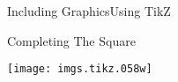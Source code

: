 \documentclass[\string~/GitHub/sthlmNordBeamerTheme/sthlmNordLightDemo.tex]{subfiles}
\begin{document}
\begin{frame}[c]{Including Graphics}{Using TikZ}
	\begin{block}{Completing The Square}
		\begin{center}
			\texttt{[image: imgs.tikz.058w]}
		\end{center}
	\end{block}
\end{frame}
\end{document}
